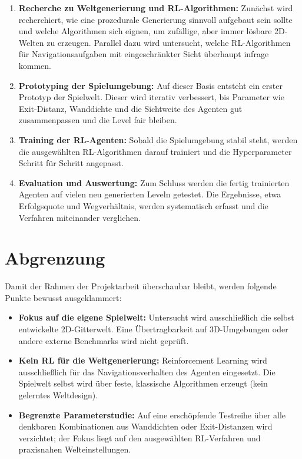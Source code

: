 \documentclass[
  a4paper,
  11pt,
  twoside,
  BCOR=8mm,           %
  headings=big,
  numbers=noenddot,
  listof=totoc,       %
  captions=tableheading,
]{scrreprt}
\begin{document}
\begin{enumerate}
    \item \textbf{Recherche zu Weltgenerierung und RL-Algorithmen:} Zunächst wird recherchiert, wie eine prozedurale Generierung sinnvoll aufgebaut sein sollte und welche Algorithmen sich eignen, um zufällige, aber immer lösbare 2D-Welten zu erzeugen. Parallel dazu wird untersucht, welche RL-Algorithmen für Navigationsaufgaben mit eingeschränkter Sicht überhaupt infrage kommen.
    \item \textbf{Prototyping der Spielumgebung:} Auf dieser Basis entsteht ein erster Prototyp der Spielwelt. Dieser wird iterativ verbessert, bis Parameter wie Exit-Distanz, Wanddichte und die Sichtweite des Agenten gut zusammenpassen und die Level fair bleiben.
    \item \textbf{Training der RL-Agenten:} Sobald die Spielumgebung stabil steht, werden die ausgewählten RL-Algorithmen darauf trainiert und die Hyperparameter Schritt für Schritt angepasst.
    \item \textbf{Evaluation und Auswertung:} Zum Schluss werden die fertig trainierten Agenten auf vielen neu generierten Leveln getestet. Die Ergebnisse, etwa Erfolgsquote und Wegverhältnis, werden systematisch erfasst und die Verfahren miteinander verglichen.
\end{enumerate}

\section{Abgrenzung}
\label{sec:abgrenzung}

Damit der Rahmen der Projektarbeit überschaubar bleibt, werden folgende Punkte bewusst ausgeklammert:

\begin{itemize}
    \item \textbf{Fokus auf die eigene Spielwelt:} Untersucht wird ausschließlich die selbst entwickelte 2D-Gitterwelt. Eine Übertragbarkeit auf 3D-Umgebungen oder andere externe Benchmarks wird nicht geprüft.
    \item \textbf{Kein RL für die Weltgenerierung:} Reinforcement Learning wird ausschließlich für das Navigationsverhalten des Agenten eingesetzt. Die Spielwelt selbst wird über feste, klassische Algorithmen erzeugt (kein gelerntes Weltdesign).
    \item \textbf{Begrenzte Parameterstudie:} Auf eine erschöpfende Testreihe über alle denkbaren Kombinationen aus Wanddichten oder Exit-Distanzen wird verzichtet; der Fokus liegt auf den ausgewählten RL-Verfahren und praxisnahen Welteinstellungen.
\end{itemize}
\end{document}
